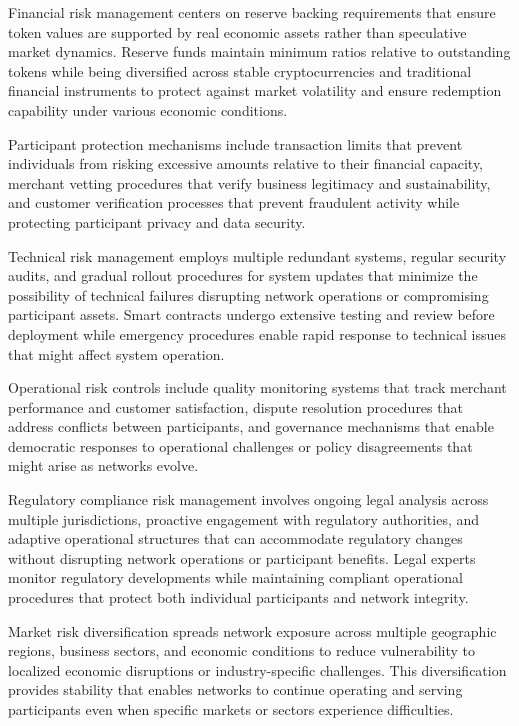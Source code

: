 \documentclass[
  Letterpaper,
]{scrbook}
\begin{document}
Financial risk management centers on reserve backing requirements that
ensure token values are supported by real economic assets rather than
speculative market dynamics. Reserve funds maintain minimum ratios
relative to outstanding tokens while being diversified across stable
cryptocurrencies and traditional financial instruments to protect
against market volatility and ensure redemption capability under various
economic conditions.

Participant protection mechanisms include transaction limits that
prevent individuals from risking excessive amounts relative to their
financial capacity, merchant vetting procedures that verify business
legitimacy and sustainability, and customer verification processes that
prevent fraudulent activity while protecting participant privacy and
data security.

Technical risk management employs multiple redundant systems, regular
security audits, and gradual rollout procedures for system updates that
minimize the possibility of technical failures disrupting network
operations or compromising participant assets. Smart contracts undergo
extensive testing and review before deployment while emergency
procedures enable rapid response to technical issues that might affect
system operation.

Operational risk controls include quality monitoring systems that track
merchant performance and customer satisfaction, dispute resolution
procedures that address conflicts between participants, and governance
mechanisms that enable democratic responses to operational challenges or
policy disagreements that might arise as networks evolve.

Regulatory compliance risk management involves ongoing legal analysis
across multiple jurisdictions, proactive engagement with regulatory
authorities, and adaptive operational structures that can accommodate
regulatory changes without disrupting network operations or participant
benefits. Legal experts monitor regulatory developments while
maintaining compliant operational procedures that protect both
individual participants and network integrity.

Market risk diversification spreads network exposure across multiple
geographic regions, business sectors, and economic conditions to reduce
vulnerability to localized economic disruptions or industry-specific
challenges. This diversification provides stability that enables
networks to continue operating and serving participants even when
specific markets or sectors experience difficulties.
\end{document}
